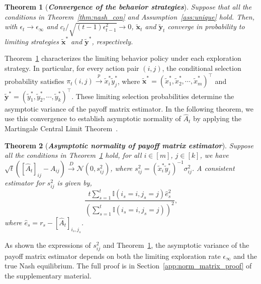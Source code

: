 \documentclass[12pt]{article}
\newtheorem{theorem}{Theorem}
\begin{document}
\begin{theorem}[{\textbf{\emph{Convergence of the behavior strategies}}}]
\label{thm:behave_con}
Suppose that all the conditions in Theorem~\ref{thm:nash_con} and
Assumption~\ref{ass:unique} hold. Then, with $\epsilon_t \to \epsilon_\infty$ and $c_t/\sqrt{(t-1)\epsilon_{t-1}^2} \to 0$, $\widetilde{\bm x}_t$ and $\widetilde{\bm y}_t$ converge in probability to limiting strategies $\widetilde{\bm x}^\ast$ and $\widetilde{\bm y}^\ast$, respectively. 
\end{theorem}
Theorem~\ref{thm:behave_con} characterizes the limiting behavior policy under each exploration strategy. In particular, for every action pair $(i,j)$, the conditional selection probability satisfies $\pi_t(i,j) \stackrel{p}{\to}  \widetilde{x}_i^\ast\widetilde{y}_j^\ast$, where $\widetilde{\bm{x}}^\ast = \left(\widetilde x^\ast_1, \widetilde x^\ast_2, \cdots, \widetilde x^\ast_{m}\right)^\top$ and $\widetilde{\bm{y}}^\ast = \left(\widetilde y^\ast_1, \widetilde y^\ast_2, \cdots, \widetilde y^\ast_{k}\right)^\top$. These limiting selection probabilities determine the asymptotic variance of the payoff matrix estimator. In the following theorem, we use this convergence to establish asymptotic normality of $\widehat A_t$ by applying the Martingale Central Limit Theorem~\citep{hall1980martingale}.


\begin{theorem}[{\textbf{\emph{Asymptotic normality of payoff matrix estimator}}}]
\label{thm:norm_matrix}
    Suppose all the conditions in Theorem~\ref{thm:behave_con} hold, for all $i \in [m]$, $j \in [k]$, we have
    $\sqrt{t}\left([\widehat{A}_t]_{ij} - A_{ij}\right) \stackrel{D}{\to} \mathcal{N}(0,s_{ij}^2)$,
    where $s_{ij}^2 = \left(\widetilde{x}_i^\ast\widetilde{y}_j^\ast\right)^{-1} \sigma_{ij}^2$.
     A consistent estimator for $s_{ij}^2$ is  given by,
    \begin{equation}
    \label{equ:var_est}
        \frac{t\sum_{s=1}^t \mathbb{I}(i_s=i,j_s=j) \widehat{e}_s^2}{\left(\sum_{s=1}^t \mathbb{I}(i_s=i,j_s=j)\right)^2},
    \end{equation}
    where $\widehat{e}_s = r_s-[\widehat{A}_t]_{i_s,j_s}$.
\end{theorem}

As shown the expressions of $s_{ij}^2$ and Theorem~\ref{thm:behave_con}, the asymptotic variance of the payoff matrix estimator depends on both the limiting exploration rate $\epsilon_\infty$ and the true Nash equilibrium. The full proof is in Section~\ref{app:norm_matrix_proof} of the supplementary material.
\end{document}
